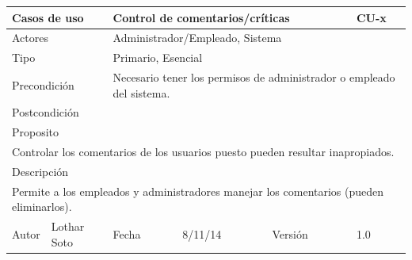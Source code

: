 \documentclass{article}
\begin{document}
\begin{table}[h]
\begin{tabular}{|l|l|l|l|l|l|}
\hline
\multicolumn{2}{|p{2cm}|}{Casos de uso}  & \multicolumn{3}{p{7cm}|}{\textbf{Control de comentarios/críticas}} & CU-x \\
\hline
\multicolumn{2}{|p{2cm}|}{Actores}       & \multicolumn{4}{p{8cm}|}{Administrador/Empleado, Sistema}        \\
\hline
\multicolumn{2}{|p{2cm}|}{Tipo}          & \multicolumn{4}{p{8cm}|}{Primario, Esencial}        \\
\hline
\multicolumn{2}{|p{2cm}|}{Precondición}  & \multicolumn{4}{p{8cm}|}{Necesario tener los permisos de administrador o empleado del sistema.}        \\
\hline
\multicolumn{2}{|p{2cm}|}{Postcondición} & \multicolumn{4}{p{8cm}|}{}        \\
\hline
\multicolumn{6}{|p{10cm}|}{Proposito}                                   \\
\hline
\multicolumn{6}{|p{10cm}|}{Controlar los comentarios de los usuarios puesto pueden resultar inapropiados.}                                            \\
\hline
\multicolumn{6}{|p{10cm}|}{Descripción}                                 \\
\hline
\multicolumn{6}{|p{10cm}|}{Permite a los empleados y administradores  manejar los comentarios (pueden eliminarlos).}                                            \\
\hline
Autor          &       Lothar Soto        & Fecha    &  8/11/14   &   Versión  & 1.0\\    
\hline
\end{tabular}
\end{table}



\end{document}
